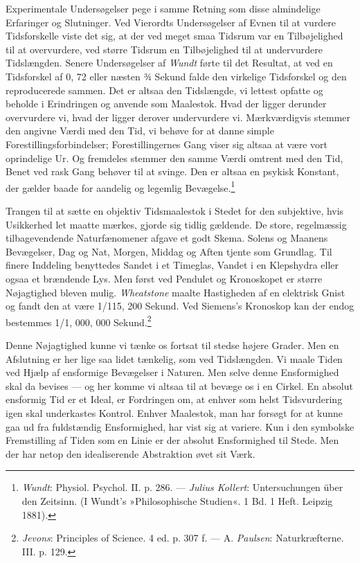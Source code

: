 \documentclass[12pt,a4paper,openany]{book}
\newcommand{\opage}[1]{\marginnote{\footnotesize\textit{[#1]}}}
\begin{document}
Experimentale Undersøgelser pege i samme Retning som disse almindelige
Erfaringer og Slutninger. Ved Vierordts Undersøgelser af Evnen til at
vurdere Tidsforskelle viste det sig, at der ved meget smaa Tidsrum var
en Tilbøjelighed til at overvurdere, ved større Tidsrum en Tilbøjelighed
til at undervurdere Tidslængden. Senere Undersøgelser af \emph{Wundt}
førte til det Resultat, at ved en Tidsforskel af 0, 72 eller næsten ¾
Sekund falde den virkelige Tidsforskel og den reproducerede sammen. Det
er altsaa den Tidslængde, vi lettest opfatte og beholde i Erindringen og
anvende som Maalestok. Hvad der ligger derunder overvurdere vi, hvad der
ligger derover undervurdere vi. Mærkværdigvis stemmer den angivne Værdi
med den Tid, vi behøve for at danne simple Forestillingsforbindelser;
\opage{234}Forestillingernes Gang viser sig altsaa at være vort
oprindelige Ur. Og fremdeles stemmer den samme Værdi omtrent med den
Tid, Benet ved rask Gang behøver til at svinge. Den er altsaa en psykisk
Konstant, der gælder baade for aandelig og legemlig
Bevægelse.\footnote[1]{\emph{Wundt}: Physiol. Psychol. II. p. 286. ---
\emph{Julius Kollert}: Untersuchungen über den Zeitsinn. (I Wundt’s
»Philosophische Studien«. 1 Bd. 1 Heft. Leipzig 1881).}

Trangen til at sætte en objektiv Tidsmaalestok i Stedet for den
subjektive, hvis Usikkerhed let maatte mærkes, gjorde sig tidlig
gældende. De store, regelmæssig tilbagevendende Naturfænomener afgave et
godt Skema. Solens og Maanens Bevægelser, Dag og Nat, Morgen, Middag og
Aften tjente som Grundlag. Til finere Inddeling benyttedes Sandet i et
Timeglas, Vandet i en Klepshydra eller ogsaa et brændende Lys. Men først
ved Pendulet og Kronoskopet er større Nøjagtighed bleven mulig.
\emph{Wheatstone} maalte Hastigheden af en elektrisk Gnist og fandt den
at være 1/115, 200 Sekund. Ved Siemens’s Kronoskop kan der endog
bestemmes 1/1, 000, 000 Sekund.\footnote[2]{\emph{Jevons}: Principles of
Science. 4 ed. p. 307 f. --- A. \emph{Paulsen}: Naturkræfterne. III. p.
129.}

Denne Nøjagtighed kunne vi tænke os fortsat til stedse højere Grader.
Men en Afslutning er her lige saa lidet tænkelig, som ved Tidslængden.
Vi maale Tiden ved Hjælp af ensformige Bevægelser i Naturen. Men selve
denne Ensformighed skal da bevises --- og her komme vi altsaa til at
bevæge os i en Cirkel. En absolut ensformig Tid er et Ideal, er
Fordringen om, at enhver som helst Tidsvurdering igen skal underkastes
Kontrol. Enhver Maalestok, man har forsøgt for at kunne gaa ud fra
fuldstændig Ensformighed, har vist sig at variere. Kun i den symbolske
Fremstilling af Tiden som en Linie er der absolut Ensformighed til
Stede. Men der har netop den idealiserende Abstraktion øvet sit Værk.
\end{document}
